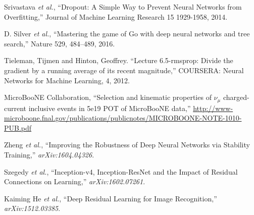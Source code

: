 \documentclass[11pt,a4paper]{article}
\begin{document}
\begin{thebibliography}{9}
  Srivastava  {\it et al.}, ``Dropout: A Simple Way to Prevent Neural Networks from Overfitting,'' Journal of Machine Learning Research 15 1929-1958, 2014.

D. Silver {\it et al.}, ``Mastering the game of Go with deep neural networks and tree search,'' Nature 529, 484–489, 2016.

Tieleman, Tijmen and Hinton, Geoffrey. ``Lecture 6.5-rmsprop: Divide the gradient by a running
average of its recent magnitude,'' COURSERA: Neural Networks for Machine Learning, 4, 2012.

  MicroBooNE Collaboration, ``Selection and kinematic properties of $\nu_\mu$ charged-current inclusive events in 5e19 POT of MicroBooNE data,''
  \protect\url{http://www-microboone.fnal.gov/publications/publicnotes/MICROBOONE-NOTE-1010-PUB.pdf}

  Zheng {\it et al.}, ``Improving the Robustness of Deep Neural Networks via Stability Training,'' \emph{arXiv:1604.04326}.

Szegedy {\it et al.}, ``Inception-v4, Inception-ResNet and the Impact of Residual Connections on Learning,'' \emph{arXiv:1602.07261}.

Kaiming He {\it et al.}, ``Deep Residual Learning for Image Recognition,'' \emph{arXiv:1512.03385}.

\end{thebibliography}
\end{document}
